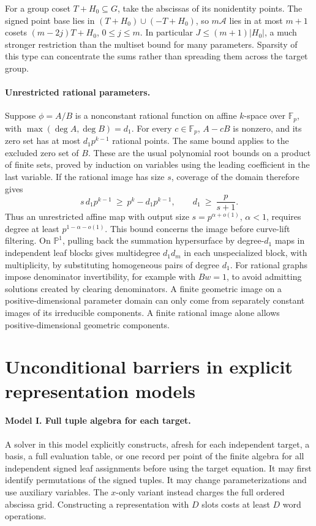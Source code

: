 \documentclass[11pt]{article}
\newcommand{\Fp}{\mathbb F_p}
\newcommand{\A}{\mathcal A}
\newcommand{\Pj}{\mathbb P}
\begin{document}
For a group coset \(T+H_0\subseteq G\), take the abscissas of its nonidentity points. The signed point base lies in \((T+H_0)\cup(-T+H_0)\), so \(m\A\) lies in at most \(m+1\) cosets \((m-2j)T+H_0\), \(0\le j\le m\). In particular \(J\le(m+1)|H_0|\), a much stronger restriction than the multiset bound for many parameters. Sparsity of this type can concentrate the sums rather than spreading them across the target group.

\paragraph{Unrestricted rational parameters.}
Suppose \(\phi=A/B\) is a nonconstant rational function on affine \(k\)-space over \(\Fp\), with \(\max(\deg A,\deg B)=d_1\). For every \(c\in\Fp\), \(A-cB\) is nonzero, and its zero set has at most \(d_1p^{k-1}\) rational points. The same bound applies to the excluded zero set of \(B\). These are the usual polynomial root bounds on a product of finite sets, proved by induction on variables using the leading coefficient in the last variable. If the rational image has size \(s\), coverage of the domain therefore gives
\[
  s\,d_1 p^{k-1}\ \ge\ p^k-d_1p^{k-1},
  \qquad d_1\ \ge\ \frac{p}{s+1}.
\tag{7}
\]
Thus an unrestricted affine map with output size \(s=p^{\alpha+o(1)}\), \(\alpha<1\), requires degree at least \(p^{1-\alpha-o(1)}\). This bound concerns the image before curve-lift filtering. On \(\Pj^1\), pulling back the summation hypersurface by degree-\(d_1\) maps in independent leaf blocks gives multidegree \(d_1d_m\) in each unspecialized block, with multiplicity, by substituting homogeneous pairs of degree \(d_1\). For rational graphs impose denominator invertibility, for example with \(Bw=1\), to avoid admitting solutions created by clearing denominators. A finite geometric image on a positive-dimensional parameter domain can only come from separately constant images of its irreducible components. A finite rational image alone allows positive-dimensional geometric components.

\section{Unconditional barriers in explicit representation models}

\paragraph{Model I. Full tuple algebra for each target.}
A solver in this model explicitly constructs, afresh for each independent target, a basis, a full evaluation table, or one record per point of the finite algebra for all independent signed leaf assignments before using the target equation. It may first identify permutations of the signed tuples. It may change parameterizations and use auxiliary variables. The \(x\)-only variant instead charges the full ordered abscissa grid. Constructing a representation with \(D\) slots costs at least \(D\) word operations.
\end{document}
